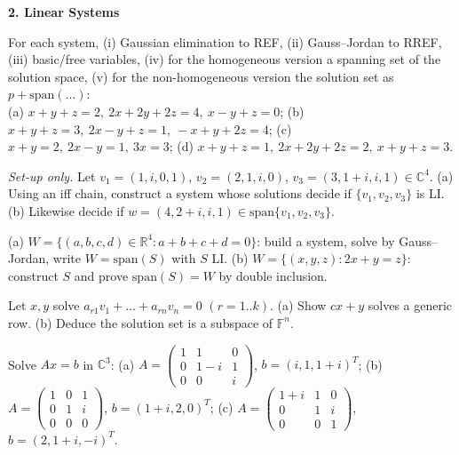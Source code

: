 \documentclass[9pt]{article}
\newcommand{\sub}[1]{\vspace{3pt}\par{\bfseries\color{NAVY}#1}\nopagebreak\par}
\newcommand{\bi}[2]{\par\noindent\hangindent=1.25cm\hangafter=1\makebox[1.25cm][l]{\textbf{\footnotesize #1}}#2\par}
\begin{document}
\sub{2. Linear Systems}
\bi{LS1}{For each system, (i) Gaussian elimination to REF, (ii) Gauss--Jordan to RREF, (iii) basic/free variables, (iv) for the homogeneous version a spanning set of the solution space, (v) for the non-homogeneous version the solution set as $p+\mathrm{span}(\dots)$: \\ (a) $x{+}y{+}z=2,\ 2x{+}2y{+}2z=4,\ x{-}y{+}z=0$; (b) $x{+}y{+}z=3,\ 2x{-}y{+}z=1,\ -x{+}y{+}2z=4$; (c) $x{+}y=2,\ 2x{-}y=1,\ 3x=3$; (d) $x{+}y{+}z=1,\ 2x{+}2y{+}2z=2,\ x{+}y{+}z=3$.}
\bi{LS2}{\textit{Set-up only.} Let $v_1=(1,i,0,1)$, $v_2=(2,1,i,0)$, $v_3=(3,1{+}i,i,1)\in\mathbb C^4$. (a) Using an iff chain, construct a system whose solutions decide if $\{v_1,v_2,v_3\}$ is LI. (b) Likewise decide if $w=(4,2{+}i,i,1)\in\mathrm{span}\{v_1,v_2,v_3\}$.}
\bi{LS3}{(a) $W=\{(a,b,c,d)\in\mathbb R^4:a+b+c+d=0\}$: build a system, solve by Gauss--Jordan, write $W=\mathrm{span}(S)$ with $S$ LI. (b) $W=\{(x,y,z):2x+y=z\}$: construct $S$ and prove $\mathrm{span}(S)=W$ by double inclusion.}
\bi{LS4}{Let $x,y$ solve $a_{r1}v_1+\dots+a_{rn}v_n=0$ $(r=1..k)$. (a) Show $cx+y$ solves a generic row. (b) Deduce the solution set is a subspace of $\mathbb F^n$.}
\bi{LS5}{Solve $Ax=b$ in $\mathbb C^3$: (a) $A=\begin{pmatrix}1&1&0\\0&1-i&1\\0&0&i\end{pmatrix}$, $b=(i,1,1{+}i)^T$; (b) $A=\begin{pmatrix}1&0&1\\0&1&i\\0&0&0\end{pmatrix}$, $b=(1{+}i,2,0)^T$; (c) $A=\begin{pmatrix}1{+}i&1&0\\0&1&i\\0&0&1\end{pmatrix}$, $b=(2,1{+}i,-i)^T$.}
\end{document}
